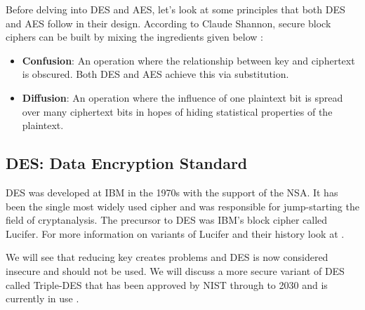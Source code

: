 Before delving into DES and AES, let's look at some principles that both DES and AES follow in their design. According to Claude Shannon, secure block ciphers can be built by mixing the ingredients given below \cite{ClaudeShannonInfoTheory}:

\begin{itemize}
\item \textbf{Confusion}: An operation where the relationship between key and ciphertext is obscured. Both DES and AES achieve this via substitution.
\item \textbf{Diffusion}: An operation where the influence of one plaintext bit is spread over many ciphertext bits in hopes of hiding statistical properties of the plaintext.
\end{itemize}

\subsection{DES: Data Encryption Standard}
\par DES was developed at IBM in the 1970s with the support of the NSA. It has been the single most widely used cipher and was responsible for jump-starting the field of cryptanalysis. The precursor to DES was IBM's block cipher called Lucifer. For more information on variants of Lucifer and their history look at 
\cite{BonehShoupBook}. \newline

\indent We will see that reducing key creates problems and DES is now considered insecure and should not be used. We will discuss a more secure variant of DES called Triple-DES that has been approved by NIST through to 2030 and is currently in use \cite{BonehShoupBook}.  \newline

